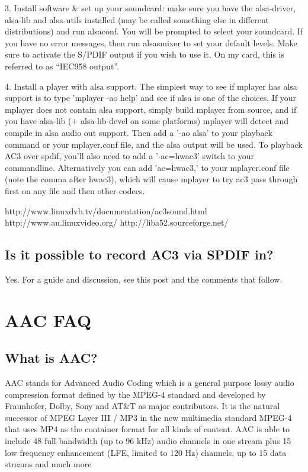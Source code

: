 ﻿\documentclass[12pt]{article}
\begin{document}
3. Install software \& set up your soundcard: make sure you have the alsa-driver, alsa-lib and
alsa-utils installed (may be called something else in different distributions) and run alsaconf. You
will be prompted to select your soundcard. If you have no error messages, then run alsasmixer to set
your default levels. Make sure to activate the S/PDIF output if you wish to use it. On my card, this
is referred to as ``IEC958 output''.

4. Install a player with alsa support. The simplest way to see if mplayer has alsa support is to
type 'mplayer -ao help' and see if alsa is one of the choices. If your mplayer does not contain alsa
support, simply build mplayer from source, and if you have alsa-lib (+ alsa-lib-devel on some
platforms) mplayer will detect and compile in alsa audio out support. Then add a '-ao alsa' to your
playback command or your mplayer.conf file, and the alsa output will be used. To playback AC3 over
spdif, you'll also need to add a '-ac=hwac3' switch to your commandline. Alternatively you can add
'ac=hwac3,' to your mplayer.conf file (note the comma after hwac3), which will cause mplayer to try
ac3 pass through first on any file and then other codecs.

http://www.linuxdvb.tv/documentation/ac3sound.html http://www.au.linuxvideo.org/
http://liba52.sourceforge.net/

\subsection{Is it possible to record AC3 via SPDIF in?}

Yes. For a guide and discussion, see this post and the comments that follow.

\section{AAC FAQ}

\subsection{What is AAC?}

AAC stands for Advanced Audio Coding which is a general purpose lossy audio compression format
defined by the MPEG-4 standard and developed by Fraunhofer, Dolby, Sony and AT\&T as major
contributors. It is the natural successor of MPEG Layer III / MP3 in the new multimedia standard
MPEG-4 that uses MP4 as the container format for all kinds of content. AAC is able to include 48
full-bandwidth (up to 96 kHz) audio channels in one stream plus 15 low frequency enhancement (LFE,
limited to 120 Hz) channels, up to 15 data streams and much more
\end{document}
